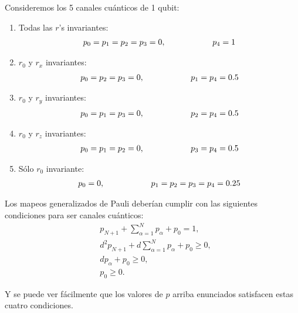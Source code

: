 \documentclass[11pt,letterpaper]{article}
\begin{document}
	\noindent Consideremos los 5 canales cuánticos de 1 qubit: 
	\begin{enumerate}
		\item Todas las $r$'s invariantes:
		\begin{align*}
		p_0 = p_1 = p_2 = p_3 = 0, \hspace*{2cm} p_4 = 1
		\end{align*}
		\item $r_0$ y $r_x$ invariantes:
		\begin{align*}
		p_0 = p_2 = p_3 = 0, \hspace*{2cm} p_1 = p_4 = 0.5
		\end{align*}
		\item $r_0$ y $r_y$ invariantes:
		\begin{align*}
		p_0 = p_1 = p_3 = 0, \hspace*{2cm} p_2 = p_4 = 0.5
		\end{align*}
		\item $r_0$ y $r_z$ invariantes:
		\begin{align*}
		p_0 = p_1 = p_2 = 0, \hspace*{2cm} p_3 = p_4 = 0.5
		\end{align*}
		\item Sólo $r_0$ invariante:
		\begin{align*}
		p_0 = 0, \hspace*{2cm} p_1 = p_2 = p_3 = p_4 = 0.25
		\end{align*}
	\end{enumerate}
	
	Los mapeos generalizados de Pauli deberían cumplir con las siguientes condiciones para ser canales cuánticos:
	\begin{align*}
		& p_{N+1} + \sum _{\alpha=1}^{N}p_{\alpha} + p_0 = 1,\\
		& d^2p_{N+1} + d\sum _{\alpha=1}^{N}p_{\alpha} + p_0 \geq 0,\\
		& dp_{\alpha} + p_0 \geq 0,\\
		& p_0 \geq 0.
	\end{align*}
	
	Y se puede ver fácilmente que los valores de $p$ arriba enunciados satisfacen estas cuatro condiciones. 
	
	
	
	
	
\end{document}
